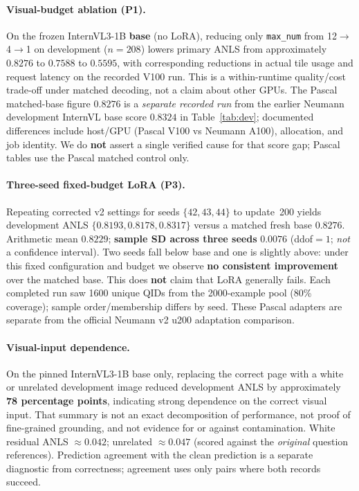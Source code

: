 \documentclass[11pt,a4paper]{article}
\begin{document}
\paragraph{Visual-budget ablation (P1).}
On the frozen InternVL3-1B \textbf{base} (no LoRA), reducing only \texttt{max\_num} from 12$\to$4$\to$1 on development ($n{=}208$) lowers primary ANLS from approximately $0.8276$ to $0.7588$ to $0.5595$, with corresponding reductions in actual tile usage and request latency on the recorded V100 run.
This is a within-runtime quality/cost trade-off under matched decoding, not a claim about other GPUs.
The Pascal matched-base figure $0.8276$ is a \emph{separate recorded run} from the earlier Neumann development InternVL base score $0.8324$ in Table~\ref{tab:dev}; documented differences include host/GPU (Pascal V100 vs Neumann A100), allocation, and job identity.
We do \textbf{not} assert a single verified cause for that score gap; Pascal tables use the Pascal matched control only.

\paragraph{Three-seed fixed-budget LoRA (P3).}
Repeating corrected v2 settings for seeds $\{42,43,44\}$ to update~200 yields development ANLS $\{0.8193,0.8178,0.8317\}$ versus a matched fresh base $0.8276$.
Arithmetic mean $0.8229$; \textbf{sample SD across three seeds} $0.0076$ (ddof${=}1$; \emph{not} a confidence interval).
Two seeds fall below base and one is slightly above: under this fixed configuration and budget we observe \textbf{no consistent improvement} over the matched base.
This does \textbf{not} claim that LoRA generally fails.
Each completed run saw 1600 unique QIDs from the 2000-example pool (80\% coverage); sample order/membership differs by seed.
These Pascal adapters are separate from the official Neumann v2 u200 adaptation comparison.

\paragraph{Visual-input dependence.}
On the pinned InternVL3-1B base only, replacing the correct page with a white or unrelated development image reduced development ANLS by approximately \textbf{78 percentage points}, indicating strong dependence on the correct visual input.
That summary is not an exact decomposition of performance, not proof of fine-grained grounding, and not evidence for or against contamination.
White residual ANLS ${\approx}0.042$; unrelated ${\approx}0.047$ (scored against the \emph{original} question references).
Prediction agreement with the clean prediction is a separate diagnostic from correctness; agreement uses only pairs where both records succeed.
\end{document}
